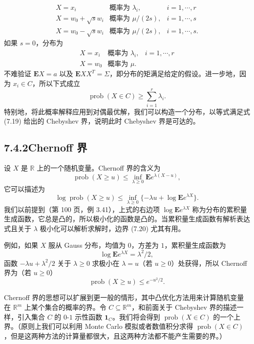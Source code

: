 \documentclass[UTF8,12pt,a4paper,fontset=fandol]{ctexart}
\begin{document}
\[
\begin{array}{lll}
X=x_i & \text{概率为 } \lambda_i, & i=1,\cdots,r\\
X=w_0+\sqrt{s}w_i & \text{概率为 } \mu/(2s), & i=1,\cdots,s\\
X=w_0-\sqrt{s}w_i & \text{概率为 } \mu/(2s), & i=1,\cdots,s.
\end{array}
\]
如果 $s=0$，分布为
\[
\begin{array}{lll}
X=x_i & \text{概率为 } \lambda_i, & i=1,\cdots,r\\
X=w_0 & \text{概率为 } \mu.
\end{array}
\]
不难验证 $\mathbf{E}X=a$ 以及 $\mathbf{E}XX^T=\Sigma$，即分布的矩满足给定的假设。进一步地，因为 $x_i\in C$，所以下式成立
\[
\operatorname{prob}(X\in C)\geq \sum_{i=1}^r\lambda_i.
\]
特别地，将此概率解释应用到对偶最优解，我们可以构造一个分布，以等式满足式 (7.19) 给出的 Chebyshev 界，说明此时 Chebyshev 界是可达的。

\subsection*{7.4.2\quad Chernoff 界}

设 $X$ 是 $\mathbb{R}$ 上的一个随机变量。Chernoff 界的含义为
\[
\operatorname{prob}(X\geq u)\leq \inf_{\lambda\geq 0}\mathbf{E}e^{\lambda(X-u)},
\]
它可以描述为
\begin{equation}
\log\operatorname{prob}(X\geq u)\leq \inf_{\lambda\geq 0}\{-\lambda u+\log\mathbf{E}e^{\lambda X}\}.
\tag{7.20}
\end{equation}
我们以前提到（第 100 页，例 3.41），上式的右边项 $\log\mathbf{E}e^{\lambda X}$ 称为分布的累积量生成函数，它总是凸的，所以极小化的函数是凸的。当累积量生成函数有解析表达式且关于 $\lambda$ 极小化可以解析求解时，边界 (7.20) 尤其有用。

例如，如果 $X$ 服从 Gauss 分布，均值为 $0$，方差为 $1$，累积量生成函数为
\[
\log\mathbf{E}e^{\lambda X}=\lambda^2/2,
\]
函数 $-\lambda u+\lambda^2/2$ 关于 $\lambda\geq 0$ 求极小在 $\lambda=u$（若 $u\geq 0$）处获得，所以 Chernoff 界为（若 $u\geq 0$）
\[
\operatorname{prob}(X\geq u)\leq e^{-u^2/2}.
\]

Chernoff 界的思想可以扩展到更一般的情形，其中凸优化方法用来计算随机变量在 $\mathbb{R}^m$ 上某个集合的概率的界。令 $C\subseteq\mathbb{R}^m$，和前面关于 Chebyshev 界的描述一样，引入集合 $C$ 的 $0$-$1$ 示性函数 $\mathbf{1}_C$。我们将会得到 $\operatorname{prob}(X\in C)$ 的一个上界。（原则上我们可以利用 Monte Carlo 模拟或者数值积分求得 $\operatorname{prob}(X\in C)$，但是这两种方法的计算量都很大，且这两种方法都不能产生需要的界。）
\end{document}
